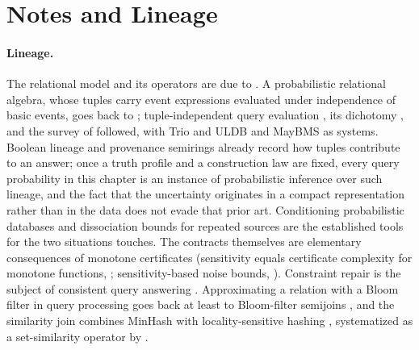 %

\section{Notes and Lineage}
\label{sec:bib-notes-ch12}

\paragraph{Lineage.}
The relational model and its operators are due to \textcite{codd-1970}. A
probabilistic relational algebra, whose
tuples carry event expressions evaluated under independence of basic events, goes
back to \textcite{fuhr-roelleke-1997}; tuple-independent query evaluation
\parencite{dalvi-suciu-2007}, its dichotomy \parencite{dalvi-suciu-2012}, and the
survey of \textcite{suciu-2011} followed, with Trio and ULDB
\parencite{widom-2005-trio, benjelloun-et-al-2008} and MayBMS
\parencite{huang-2009-maybms} as systems. Boolean lineage and provenance
semirings \parencite{green-karvounarakis-tannen-2007}
already record how tuples contribute to an answer; once a truth profile and a
construction law are fixed, every query probability in this chapter is an instance
of probabilistic inference over such lineage, and the
fact that the uncertainty originates in a compact representation rather than in the
data does not evade that prior art. Conditioning probabilistic databases
\parencite{koch-olteanu-2008} and dissociation bounds for repeated sources
\parencite{gatterbauer-suciu-2014} are the established tools for the two
situations  touches. The contracts themselves are
elementary consequences of monotone certificates (sensitivity equals certificate
complexity for monotone functions, \textcite{nisan-1991}; sensitivity-based noise
bounds, \textcite{gopalan-et-al-2016}). Constraint repair is the subject of
consistent query answering \parencite{bertossi-2011}. Approximating a relation with
a Bloom filter \parencite{bloomfilter} in query processing goes back at least to
Bloom-filter semijoins \parencite{mullin-1990}, and the similarity join combines
MinHash \parencite{broder-1997} with locality-sensitive hashing
\parencite{indyk-motwani-1998}, systematized as a set-similarity operator by
\textcite{sarawagi-kirpal-2004}.

